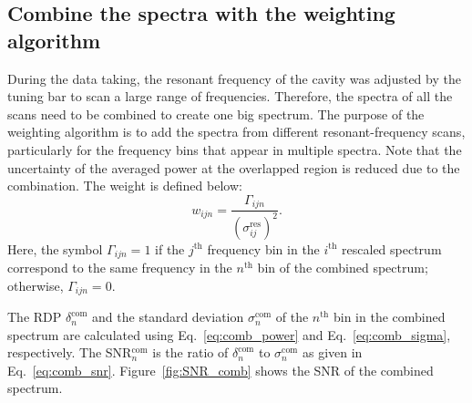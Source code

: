 \subsection{Combine the spectra with the weighting algorithm} 
\label{sec:weighting_algorithm}
During the data taking, the resonant frequency of the cavity was  
adjusted by the tuning bar to scan a large range of frequencies.  
Therefore, the spectra of all the scans need to be combined to create one 
big spectrum. 
The purpose of the weighting algorithm is to add the spectra from different 
resonant-frequency scans,
 particularly for the frequency bins that appear in multiple spectra. 
Note that the uncertainty of the averaged power at the overlapped region is 
reduced due to the combination.  
The weight is defined below: 
\begin{equation}
    \label{eq:weight}
    {w_{ijn}} = \frac{\Gamma_{ijn}}{(\sigma_{ij}^\text{res})^{2}}.
\end{equation}
Here, the symbol $\Gamma_{ijn}=1$ if the $j^\text{th}$ frequency bin in the 
$i^\text{th}$ rescaled spectrum correspond to the same frequency in 
the $n^\text{th}$ bin of the combined spectrum; otherwise, $\Gamma_{ijn}=0$.

The RDP $\delta^\text{com}_{n}$ and the standard deviation 
$\sigma^\text{com}_{n}$ of the $n^\text{th}$ bin in the combined spectrum are 
calculated using Eq.~\eqref{eq:comb_power} and Eq.~\eqref{eq:comb_sigma}, 
respectively. The SNR$^\text{com}_{n}$ is the ratio of 
$\delta^\text{com}_{n}$ to 
$\sigma^\text{com}_{n}$ as given in Eq.~\eqref{eq:comb_snr}. 
Figure~\ref{fig:SNR_comb} shows the SNR of the combined spectrum. 

